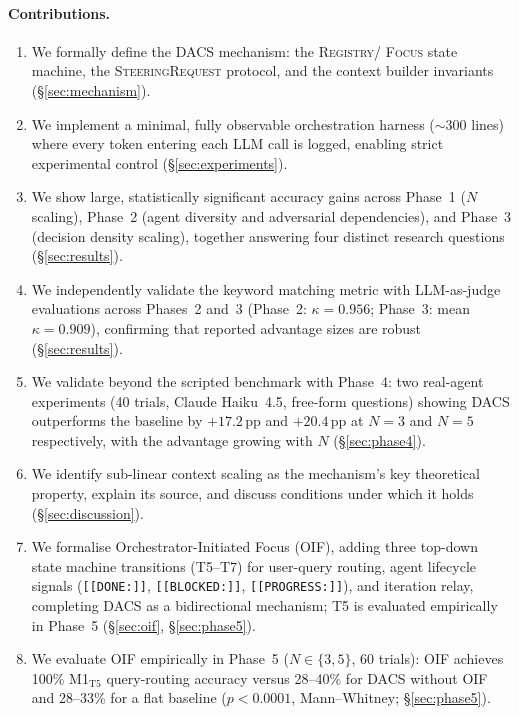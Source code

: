 \documentclass{article}
\begin{document}
\paragraph{Contributions.}
\begin{enumerate}
  \item We formally define the DACS mechanism: the \textsc{Registry}/
  \textsc{Focus} state machine, the \textsc{SteeringRequest} protocol,
  and the context builder invariants (\S\ref{sec:mechanism}).
  \item We implement a minimal, fully observable orchestration harness
  ($\sim$300 lines) where every token entering each LLM call is logged,
  enabling strict experimental control (\S\ref{sec:experiments}).
  \item We show large, statistically significant accuracy gains across
  Phase~1 ($N$ scaling), Phase~2 (agent diversity and adversarial
  dependencies), and Phase~3 (decision density scaling), together
  answering four distinct research questions (\S\ref{sec:results}).
  \item We independently validate the keyword matching metric with
  LLM-as-judge evaluations across Phases~2 and~3 (Phase~2: $\kappa=0.956$;
  Phase~3: mean $\kappa=0.909$), confirming that reported advantage sizes
  are robust (\S\ref{sec:results}).
  \item We validate beyond the scripted benchmark with Phase~4: two
  real-agent experiments (40 trials, Claude Haiku~4.5, free-form questions)
  showing DACS outperforms the baseline by $+17.2$\,pp and $+20.4$\,pp at
  $N{=}3$ and $N{=}5$ respectively, with the advantage growing with $N$
  (\S\ref{sec:phase4}).
  \item We identify sub-linear context scaling as the mechanism's key
  theoretical property, explain its source, and discuss conditions under
  which it holds (\S\ref{sec:discussion}).
  \item We formalise Orchestrator-Initiated Focus (OIF), adding three
  top-down state machine transitions (T5--T7) for user-query routing,
  agent lifecycle signals (\texttt{[[DONE:]]}, \texttt{[[BLOCKED:]]},
  \texttt{[[PROGRESS:]]}), and iteration relay, completing DACS as a
  bidirectional mechanism; T5 is evaluated empirically in Phase~5
  (\S\ref{sec:oif}, \S\ref{sec:phase5}).
  \item We evaluate OIF empirically in Phase~5 ($N{\in}\{3,5\}$, 60 trials):
  OIF achieves 100\% M1$_{\mathrm{T5}}$ query-routing accuracy versus
  28--40\% for DACS without OIF and 28--33\% for a flat baseline
  ($p < 0.0001$, Mann--Whitney; \S\ref{sec:phase5}).
\end{enumerate}
\end{document}
